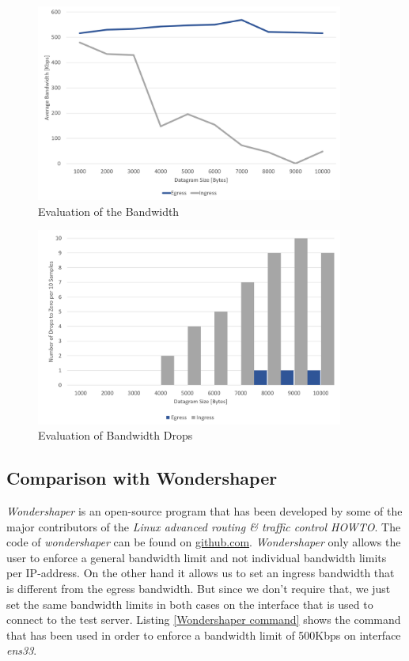 \begin{figure}[h]
	\centering
	\includegraphics[width=0.9\textwidth]{img/Evaluation-Bandwidth.png}
	\caption{Evaluation of the Bandwidth}
	\label{Evaluation of the Bandwidth}
\end{figure}

\begin{figure}[h]
	\centering
	\includegraphics[width=0.9\textwidth]{img/Evaluation-Zeros.png}
	\caption{Evaluation of Bandwidth Drops}
	\label{Evaluation of the Bandwidth Drops}
\end{figure}

\newpage
\textit{ }
\newpage
\subsection{Comparison with Wondershaper}

\textit{Wondershaper} is an open-source program that has been developed by some of the major contributors of the \textit{Linux advanced routing \& traffic control HOWTO}\cite
{hubert2002linux}. The code of \textit{wondershaper} can be found on \href{https://github.com/magnific0/wondershaper}{github.com}\cite{hubert2002wondershaper}. \textit{Wondershaper} only allows the user to enforce a general bandwidth limit and not individual bandwidth limits per \acs{IP}-address. On the other hand it allows us to set an ingress bandwidth that is different from the egress bandwidth. But since we don't require that, we just set the same bandwidth limits in both cases on the interface that is used to connect to the test server. Listing \ref{Wondershaper command} shows the command that has been used in order to enforce a bandwidth limit of 500Kbps on interface \textit{ens33}.

